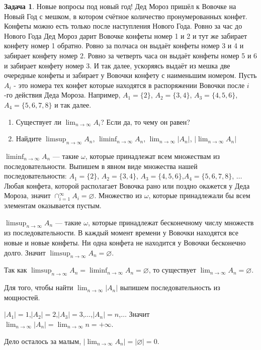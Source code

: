 \documentclass[pdftex, 12pt, a4paper]{article}
\def \om{\omega}
\renewcommand{\to}{\rightarrow}
\theoremstyle{definition} %
\newtheorem{problem}{Задача}
\numberwithin{problem}{section}
\numberwithin{blits}{section}
\begin{document}
\begin{problem} Новые вопросы под новый год!
Дед Мороз пришёл к Вовочке на Новый Год с мешком, в котором счётное количество пронумерованных конфет. Конфеты можно есть только после наступления Нового Года. Ровно за час до Нового Года Дед Мороз дарит Вовочке конфеты номер 1 и 2 и тут же забирает конфету номер 1 обратно. Ровно за полчаса он выдаёт конфеты номер 3 и 4 и забирает конфету номер 2. Ровно за четверть часа он выдаёт конфеты номер 5 и 6 и забирает конфету номер 3. И так далее, ускоряясь выдаёт из мешка две очередные конфеты и забирает у Вовочки конфету с наименьшим номером. Пусть $A_{i}$ - это номера тех конфет которые находятся в распоряжении Вовочки после $i$-го действия Деда Мороза. Например, $A_{1}=\{2\}$, $A_{2}=\{3,4\}$, $A_{3}=\{4,5,6\}$, $A_{4} = \{5,6,7,8\}$ и так далее.

\begin{enumerate}
\item Существует ли $\lim_{n \to \infty} A_{i}$? Если да, то чему он равен?

\item Найдите  $\limsup_{n \to \infty} A_n$, $\liminf_{n \to \infty} A_n$, $ \lim_{n \to \infty} |A_n|$, $|\lim_{n \to \infty} A_n |$
\end{enumerate}

\begin{sol}
$\liminf_{n \to \infty} A_n$ --- такие $\om$, которые принадлежат всем множествам из последовательности. Выпишем в явном виде множества нашей последовательности: $A_{1}=\{2\}$, $A_{2}=\{3,4\}$, $A_{3}=\{4,5,6\}$,$A_{4} = \{5,6,7,8\}$, $\ldots$ Любая конфета, которой располагает Вовочка рано или поздно окажется у Деда Мороза, значит $\cap_{i=1}^{\infty} A_i = \varnothing$. Множество из $\om$, которые принадлежали бы всем элементам оказывается пустым.

$\limsup_ {n \to \infty} A_n$ --- такие $\om$, которые принадлежат бесконечному числу множеств из последовательности. В каждый момент времени у Вовочки находятся все новые и новые конфеты. Ни одна конфета не находится у Вовочки бесконечно долго. Значит $\limsup_ {n \to \infty} A_n = \varnothing$.

Так как $\limsup_ {n \to \infty} A_n=\liminf_{n \to \infty} A_n = \varnothing$, то существует $\lim_{n \to \infty} A_n = \varnothing$.

Для того, чтобы найти $\lim_{n \to \infty} |A_n|$ выпишем последовательность из мощностей.

 $|A_1|=1$,$|A_2|=2$,$|A_3|=3$,$\ldots$,$|A_n|=n$,$\ldots$ Значит $\lim_{n \to \infty} |A_n| = \lim_{n \to \infty} n = +\infty$.

Дело осталось за малым, $|\lim_{n \to \infty} A_{n}| =|\varnothing| = 0.$
\end{sol}
\end{problem}
\end{document}
